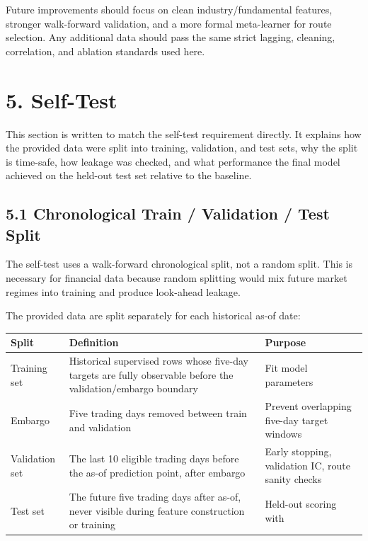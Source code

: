 \documentclass[11pt]{article}
\newcommand{\code}[1]{{\ttfamily\footnotesize\seqsplit{#1}}}
\begin{document}
Future improvements should focus on clean industry/fundamental features,
stronger walk-forward validation, and a more formal meta-learner for
route selection. Any additional data should pass the same strict
lagging, cleaning, correlation, and ablation standards used here.

\section{5. Self-Test}\label{self-test}

This section is written to match the self-test requirement directly. It
explains how the provided data were split into training, validation, and
test sets, why the split is time-safe, how leakage was checked, and what
performance the final model achieved on the held-out test set relative
to the baseline.

\subsection{5.1 Chronological Train / Validation / Test
Split}\label{chronological-train-validation-test-split}

The self-test uses a walk-forward chronological split, not a random
split. This is necessary for financial data because random splitting
would mix future market regimes into training and produce look-ahead
leakage.

The provided data are split separately for each historical as-of date:

\begin{longtable}[]{@{}|
  >{\RaggedRight\arraybackslash}m{}|
  >{\RaggedRight\arraybackslash}m{}|
  >{\RaggedRight\arraybackslash}m{}|@{}}
\hline\rowcolor{tableHead}
\begin{minipage}[c]{\linewidth}\centering\bfseries
Split
\end{minipage} & \begin{minipage}[c]{\linewidth}\centering\bfseries
Definition
\end{minipage} & \begin{minipage}[c]{\linewidth}\centering\bfseries
Purpose
\end{minipage} \\
\hline
\endhead
\hline
\endlastfoot
Training set & Historical supervised rows whose five-day targets are
fully observable before the validation/embargo boundary & Fit model
parameters \\
\hline
Embargo & Five trading days removed between train and validation &
Prevent overlapping five-day target windows \\
\hline
Validation set & The last 10 eligible trading days before the as-of
prediction point, after embargo & Early stopping, validation IC, route
sanity checks \\
\hline
Test set & The future five trading days after as-of, never visible
during feature construction or training & Held-out scoring with
\code{score\_submission.py} \\
\end{longtable}
\end{document}
